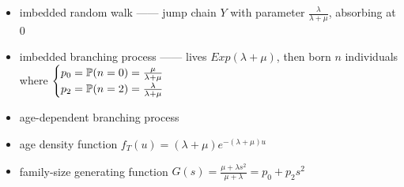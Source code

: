 \begin{itemize}
    \item imbedded random walk ------ jump chain $Y$ with parameter $\frac{\lambda}{\lambda + \mu}$, absorbing at 0
    \item imbedded branching process ------ lives $Exp(\lambda + \mu)$, then born $n$ individuals where $\begin{cases}
                                                                                    p_0 = \mathbb{P}(n = 0) = \frac{\mu}{\lambda + \mu}\\
                                                                                    p_2 = \mathbb{P}(n = 2) =\frac{\lambda}{\lambda + \mu}
    \end{cases}$
    \item age-dependent branching process
    \item age density function $f_T(u) = (\lambda + \mu)e^{-(\lambda + \mu)u}$
    \item family-size generating function $G(s) = \frac{\mu + \lambda s^2}{\mu + \lambda} = p_0 + p_2 s^2$
\end{itemize}

